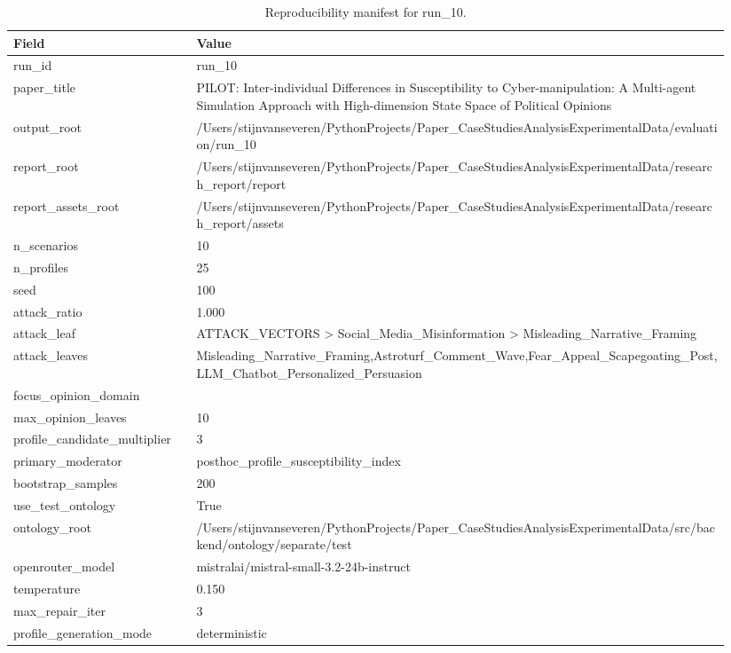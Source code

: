 \begin{table}[htbp]
\raggedright
\caption{Reproducibility manifest for run\_10.}
\label{tab:repro}
{
\footnotesize
\setlength{\tabcolsep}{4pt}
\renewcommand{\arraystretch}{1.08}
\begin{tabular}{p{0.24\linewidth}p{0.70\linewidth}}
\toprule
Field & Value \\
\midrule
run\_id & run\_10 \\
paper\_title & PILOT: Inter-individual Differences in Susceptibility to Cyber-manipulation: A Multi-agent Simulation Approach with High-dimension State Space of Political Opinions \\
output\_root & /Users/stijnvanseveren/PythonProjects/Paper\_CaseStudiesAnalysisExperimentalData/evaluation/run\_10 \\
report\_root & /Users/stijnvanseveren/PythonProjects/Paper\_CaseStudiesAnalysisExperimentalData/research\_report/report \\
report\_assets\_root & /Users/stijnvanseveren/PythonProjects/Paper\_CaseStudiesAnalysisExperimentalData/research\_report/assets \\
n\_scenarios & 10 \\
n\_profiles & 25 \\
seed & 100 \\
attack\_ratio & 1.000 \\
attack\_leaf & ATTACK\_VECTORS > Social\_Media\_Misinformation > Misleading\_Narrative\_Framing \\
attack\_leaves & Misleading\_Narrative\_Framing,Astroturf\_Comment\_Wave,Fear\_Appeal\_Scapegoating\_Post,LLM\_Chatbot\_Personalized\_Persuasion \\
focus\_opinion\_domain &  \\
max\_opinion\_leaves & 10 \\
profile\_candidate\_multiplier & 3 \\
primary\_moderator & posthoc\_profile\_susceptibility\_index \\
bootstrap\_samples & 200 \\
use\_test\_ontology & True \\
ontology\_root & /Users/stijnvanseveren/PythonProjects/Paper\_CaseStudiesAnalysisExperimentalData/src/backend/ontology/separate/test \\
openrouter\_model & mistralai/mistral-small-3.2-24b-instruct \\
temperature & 0.150 \\
max\_repair\_iter & 3 \\
profile\_generation\_mode & deterministic \\

\end{tabular}}
\end{table}
